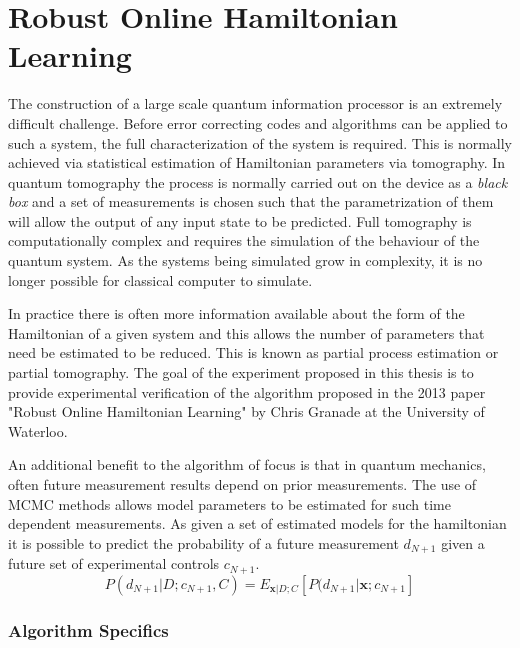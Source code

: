 \section{Robust Online Hamiltonian Learning}
\label{sec:robosthamiltonian}
The construction of a large scale quantum information processor is an extremely difficult challenge. Before error correcting codes and algorithms can be applied to such a system, the full characterization of the system is required. This is normally achieved via statistical estimation of Hamiltonian parameters via tomography. In quantum tomography the process is normally carried out on the device as a \textit{black box} and a set of measurements is chosen such that the parametrization of them will allow the output of any input state to be predicted.\cite{tomography} Full tomography is computationally complex and requires the simulation of the behaviour of the quantum system. As the systems being simulated grow in complexity, it is no longer possible for classical computer to simulate.\cite{simulate}

In practice there is often more information available about the form of the Hamiltonian of a given system and this allows the number of parameters that need be estimated to be reduced. This is known as partial process estimation or partial tomography. The goal of the experiment proposed in this thesis is to provide experimental verification of the algorithm proposed in the 2013 paper "Robust Online Hamiltonian Learning" by Chris Granade at the University of Waterloo.\cite{hamiltonian_learning} 

An additional benefit to the algorithm of focus is that in quantum mechanics, often future measurement results depend on prior measurements. The use of MCMC methods allows model parameters to be estimated for such time dependent measurements. As given a set of estimated models for the hamiltonian it is possible to predict the probability of a future measurement $d_{N+1}$ given a future set of experimental controls $c_{N+1}$. 
\begin{equation}
P(d_{N+1}\big|D;c_{N+1},C) = E_{\mathbf{x}|D;C}[P(d_{N+1}\big|\mathbf{x};c_{N+1}]
\label{eq:batch}
\end{equation}

\subsubsection{Algorithm Specifics}
